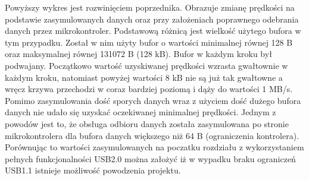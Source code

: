 \documentclass{BscUS}
\newcommand\blankpage{%
    \null
    \thispagestyle{empty}%
    \newpage}
\begin{document}
\noindent Powyższy wykres jest rozwinięciem poprzednika. Obrazuje zmianę prędkości na podstawie zasymulowanych danych oraz przy założeniach poprawnego odebrania danych przez mikrokontroler. Podstawową różnicą jest wielkość użytego bufora w tym przypadku. Został w nim użyty bufor o wartości minimalnej równej 128 B oraz maksymalnej równej 131072 B (128 kB). Bufor w każdym kroku był podwajany. Początkowo wartość uzyskiwanej prędkości wzrasta gwałtownie w każdym kroku, natomiast powyżej wartości 8 kB nie są już tak gwałtowne a wręcz krzywa przechodzi w coraz bardziej poziomą i dąży do wartości 1 MB/s. 
\newline
\indent Pomimo zasymulowania dość sporych danych wraz z użyciem dość dużego bufora danych nie udało się uzyskać oczekiwanej minimalnej prędkości. Jednym z powodów jest to, że obsługa odbioru danych została zasymulowana po stronie mikrokontrolera dla bufora danych większego niż 64 B (ograniczenia kontrolera). Porównując to wartości zasymulowanych na poczatku rozdziału z wykorzystaniem pełnych funkcjonalności USB2.0 można założyć iż w wypadku braku ograniczeń USB1.1 istnieje możliwość powodzenia projektu.
\afterpage{\blankpage}
\end{document}
